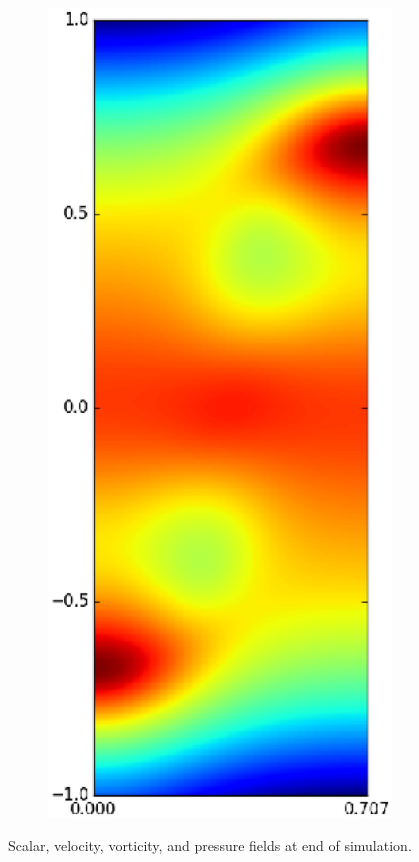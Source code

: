 \begin{figure}
\begin{subfigure}[b]{0.24\textwidth}
\end{subfigure}
\begin{subfigure}[b]{0.24\textwidth}
\includegraphics[width=\textwidth]{gfx/cnv_o16_e32-p_yz-0033}
\end{subfigure}
\caption{ 
Scalar, velocity, vorticity, and pressure fields at end of simulation.
}
\end{figure}

